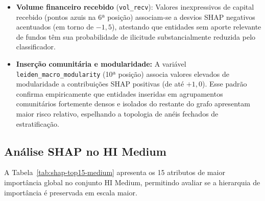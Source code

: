 \documentclass[titlepage,a4paper,oneside,onecolumn,12pt]{report}
\begin{document}
\begin{itemize}
    \item \textbf{Volume financeiro recebido} (\texttt{vol\_recv}): Valores inexpressivos de capital recebido (pontos azuis na 6ª posição) associam-se a desvios SHAP negativos acentuados (em torno de $-1{,}5$), atestando que entidades sem aporte relevante de fundos têm sua probabilidade de ilicitude substancialmente reduzida pelo classificador.
    
    \item \textbf{Inserção comunitária e modularidade:} A variável \texttt{leiden\_macro\_modularity} (10ª posição) associa valores elevados de modularidade a contribuições SHAP positivas (de até $+1{,}0$). Esse padrão confirma empiricamente que entidades inseridas em agrupamentos comunitários fortemente densos e isolados do restante do grafo apresentam maior risco relativo, espelhando a topologia de anéis fechados de estratificação.
\end{itemize}

\subsection{Análise SHAP no HI Medium}

A Tabela~\ref{tab:shap-top15-medium} apresenta os 15 atributos de maior importância global no conjunto HI Medium, permitindo avaliar se a hierarquia de importância é preservada em escala maior.
\end{document}
